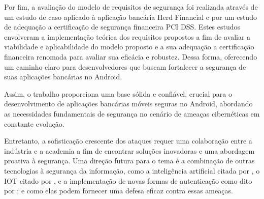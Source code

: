     Por fim, a avaliação do modelo de requisitos de segurança foi realizada através de um estudo de caso aplicado à aplicação bancária Herd Financial e por um estudo de adequação a certificação de segurança financeira PCI DSS. Estes estudos envolveram a implementação teórica dos requisitos propostos a fim de avaliar a viabilidade e aplicabilidade do modelo proposto e a sua adequação a certificação financeira renomada para avaliar sua eficácia e robustez. Dessa forma, oferecendo um caminho claro para desenvolvedores que buscam fortalecer a segurança de suas aplicações bancárias no Android.
    
    Assim, o trabalho proporciona uma base sólida e confiável, crucial para o desenvolvimento de aplicações bancárias móveis seguras no Android, abordando as necessidades fundamentais de segurança no cenário de ameaças cibernéticas em constante evolução.

    Entretanto, a sofisticação crescente dos ataques requer uma colaboração entre a indústria e a academia a fim de encontrar soluções inovadoras e uma abordagem proativa à segurança. Uma direção futura para o tema é a combinação de outras tecnologias à segurança da informação, como a inteligência artificial citada por  , o IOT citado por , e a implementação de novas formas de autenticação como dito por ; e como elas podem fornecer uma defesa eficaz contra essas ameaças.